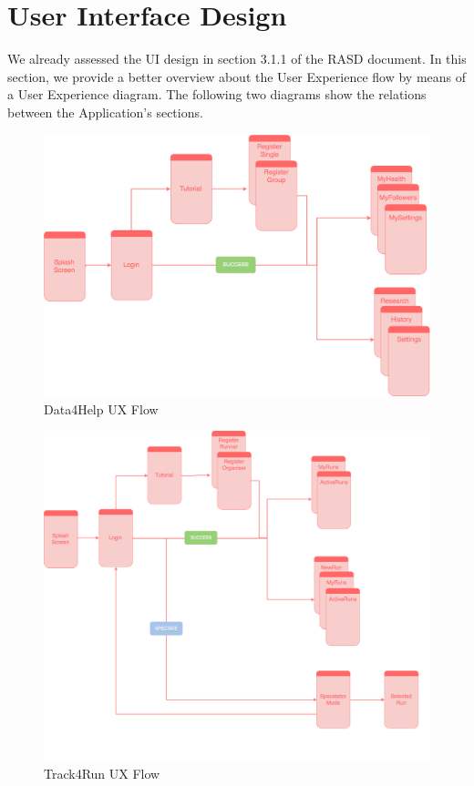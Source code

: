 \documentclass[titlepage]{article}
\begin{document}
\pagebreak


\section{User Interface Design}
We already assessed the  UI design in section 3.1.1 of the RASD document. In this section, we provide a better overview about the User Experience flow by means of a User Experience diagram. The following two diagrams show the relations between the Application’s sections.
\begin{figure}[H]
	\center
  	\includegraphics[width=15cm]{UXD4HDiagram.png}
  	\caption{Data4Help UX Flow}
 	\label{fig:D4HUX}
\end{figure}
\begin{figure}[H]
	\center
  	\includegraphics[width=15cm]{UXT4RDiagram.png}
  	\caption{Track4Run UX Flow}
 	\label{fig:T4RUX}
\end{figure}
\pagebreak
\end{document}
